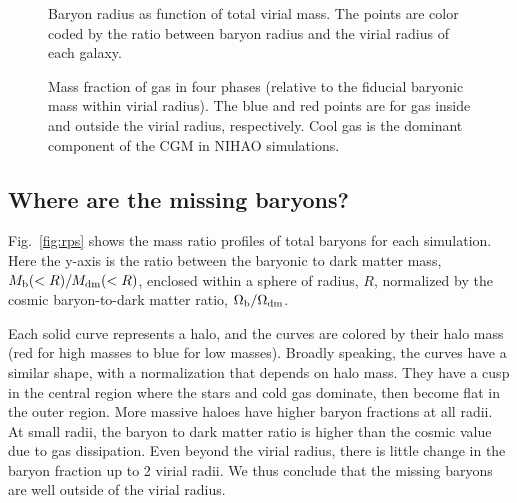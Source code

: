 \documentclass[useAMS,usenatbib]{mn2e}
\begin{document}
\begin{figure}
\centerline{
}
\caption{Baryon radius as function of total virial mass.
         The points are color coded by the ratio 
         between baryon radius and the virial radius of each galaxy.}
\label{fig:missvr}
\end{figure}

\begin{figure*}
\centerline{
}
\caption{Mass fraction of gas in four phases (relative to the fiducial
  baryonic mass within virial radius). The blue and red points are for
  gas  inside and outside the virial radius, respectively. Cool gas is
  the dominant component of the CGM in NIHAO simulations.}
\label{fig:inout}
\end{figure*}





\subsection{Where are the missing baryons?}
\label{sec:where}

Fig.~\ref{fig:rps} shows the mass ratio profiles of total baryons  for
each simulation. Here the y-axis is the ratio between the baryonic to
dark matter mass, $M_{\rm b}(<R) / M_{\rm dm}(<R)$, enclosed
within a sphere of radius, $R$, normalized by the cosmic
baryon-to-dark matter ratio, $\Omega_{\rm b}/\Omega_{\rm dm}$.

Each solid curve represents a halo, and the curves are colored by
their halo mass (red for high masses to blue for low masses).  Broadly
speaking, the curves have a similar shape, with a normalization that
depends on halo mass. They have a cusp in  the central region where the
stars and cold gas dominate, then become flat in the outer region.
More massive haloes have higher baryon fractions at all radii.  At
small radii, the baryon to dark matter ratio is higher than the cosmic
value due to gas dissipation.  Even beyond the virial radius, there is
little change in the baryon fraction up to 2 virial radii.  We thus
conclude that the missing baryons are well outside of the virial
radius.

\end{document}
